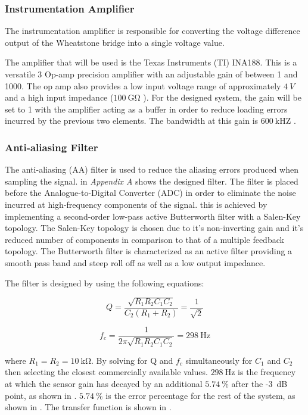 \documentclass[10pt,twocolumn]{witseiepaper}
\begin{document}
\subsubsection{Instrumentation Amplifier}

The instrumentation amplifier is responsible for converting the voltage difference output of the Wheatstone bridge into a single voltage value.

The amplifier that will be used is the Texas Instruments (TI) INA188. This is a versatile 3 Op-amp precision amplifier with an adjustable gain of between 1 and 1000. The op amp also provides a low input voltage range of approximately $4~V$ and a high input impedance ($100~\mathrm{G\Omega}$ \cite{ina188}). For the designed system, the gain will be set to 1 with the amplifier acting as a buffer in order to reduce loading errors incurred by the previous two elements. The bandwidth at this gain is $600~\mathrm{kHZ}$ \cite{ina188}.

\subsubsection{Anti-aliasing Filter}

The anti-aliasing (AA) filter is used to reduce the aliasing errors produced when sampling the signal.  in \textit{Appendix A} shows the designed filter. The filter is placed before the Analogue-to-Digital Converter (ADC) in order to eliminate the noise incurred at high-frequency components of the signal. this is achieved by implementing a second-order low-pass active Butterworth filter with a Salen-Key topology. The Salen-Key topology is chosen due to it's non-inverting gain and it's reduced number of components in comparison to that of a multiple feedback topology. The Butterworth filter is characterized as an active filter providing a smooth pass band and steep roll off as well as a low output impedance.

The filter is designed by using the following equations:

\begin{equation}
	Q =  \frac{\sqrt{R_1 R_2 C_1 C_2}}{C_2 (R_1 + R_2)} = \frac{1}{\sqrt{2}}
\end{equation}

\begin{equation}
	f_c = \frac{1}{2 \pi \sqrt{R_1 R_2 C_1 C_2}} = 298~\mathrm{Hz}
\end{equation}

where $R_1 = R_2 = 10~\mathrm{k\Omega}$. By solving for Q and $f_c$ simultaneously for $C_1$ and $C_2$ then selecting the closest commercially available values. $298~\mathrm{Hz}$ is the frequency at which the sensor gain has decayed by an additional $5.74~\%$ after the -3~dB point, as shown in . $5.74~\%$ is the error percentage for the rest of the system, as shown in . The transfer function is shown in .
\end{document}
